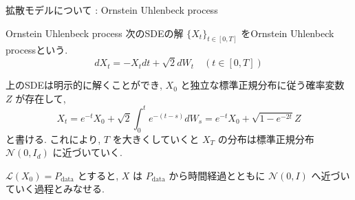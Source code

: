 \documentclass[11pt]{beamer}
\newcommand{\Pdata}{P_{\text{data}}}
\newcommand{\StdNormal}{\mathcal{N}(0,I_d)}
\begin{document}
\begin{frame}{拡散モデルについて : Ornstein Uhlenbeck process}
    \begin{block}{Ornstein Uhlenbeck process}
      次のSDEの解 $\{X_t\}_{t\in[0,T]}$ をOrnstein Uhlenbeck processという.
      \begin{equation*}
        dX_t=-X_tdt+\sqrt{2}dW_t \quad (t\in[0,T])
      \end{equation*}
    \end{block}
      上のSDEは明示的に解くことができ, $X_0$ と独立な標準正規分布に従う確率変数 $Z$ が存在して,
      \begin{equation*}
        X_t=e^{-t}X_0+\sqrt{2}\int_{0}^{t}e^{-(t-s)}dW_s=e^{-t}X_0+\sqrt{1-e^{-2t}}Z
      \end{equation*}
      と書ける. これにより, $T$ を大きくしていくと $X_T$ の分布は標準正規分布 $\StdNormal$ に近づいていく.

      $\mathcal{L}(X_0)=\Pdata$ とすると, $X$ は $\Pdata$ から時間経過とともに
      $\mathcal{N}(0,I)$ へ近づいていく過程とみなせる.
    \begin{center}
    \end{center}

\end{frame}
\end{document}
